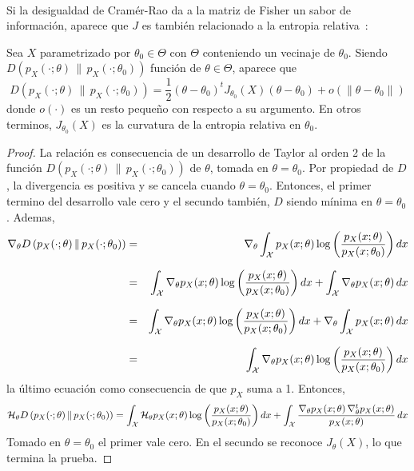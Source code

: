 \

Si  la  desigualdad de  Cram\'er-Rao  da  a la  matriz  de  Fisher  un sabor  de
informaci\'on,  aparece   que  $J$  es  tambi\'en  relacionado   a  la  entropia
relativa~\cite{CovTho06, Fri04}:
%
\begin{teorema}
  Sea $X$  parametrizado por $\theta_0  \in \Theta$ con $\Theta$  conteniendo un
  vecinaje  de   $\theta_0$.   Siendo   $D\left(  p_X(\cdot;\theta)  \,   \|  \,
    p_X(\cdot;\theta_0)  \right)$  funci\'on  de  $\theta \in  \Theta$,  aparece
  que
  \[
  D  \left( p_X(\cdot;\theta)  \, \|  \, p_X(\cdot;\theta_0)  \right)  = \frac12
  \left( \theta  - \theta_0 \right)^t  J_{\theta_0}(X) \left( \theta  - \theta_0
  \right) + o\left( \| \theta - \theta_0 \|\right)
  \]
  donde $o(\cdot)$ es un resto peque\~no  con respecto a su argumento.  En otros
  terminos,  $J_{\theta_0}(X)$  es  la  curvatura  de la  entropia  relativa  en
  $\theta_0$.
\end{teorema}
%
\begin{proof}
  La relaci\'on  es consecuencia  de un desarrollo  de Taylor  al orden 2  de la
  funci\'on $D\left( p_X(\cdot;\theta) \,  \| \, p_X(\cdot;\theta_0) \right)$ de
  $\theta$, tomada en $\theta =  \theta_0$. Por propiedad de $D$, la divergencia
  es  positiva y  se cancela  cuando $\theta  = \theta_0$.  Entonces,  el primer
  termino del desarrollo  vale cero y el secundo  tambi\'en, $D$ siendo m\'inima
  en $\theta = \theta_0$. Ademas,
  \begin{eqnarray*}
  \nabla_\theta D\left( p_X(\cdot;\theta) \, \| \, p_X(\cdot;\theta_0) \right) & =
  & \nabla_\theta \int_{\mathcal{X}} p_X(x;\theta) \log \left(
  \frac{p_X(x;\theta)}{p_X(x;\theta_0)} \right) dx\\[2.5mm]
  & = & \int_{\mathcal{X}} \nabla_\theta p_X(x;\theta) \log \left(
  \frac{p_X(x;\theta)}{p_X(x;\theta_0)} \right) dx + \int_{\mathcal{X}} \nabla_\theta
  p_X(x;\theta) \, dx\\[2.5mm]
  & = & \int_{\mathcal{X}} \nabla_\theta p_X(x;\theta) \log \left(
  \frac{p_X(x;\theta)}{p_X(x;\theta_0)} \right) dx + \nabla_\theta \int_{\mathcal{X}}
  p_X(x;\theta) \, dx\\[2.5mm]
  & = & \int_{\mathcal{X}} \nabla_\theta p_X(x;\theta) \log \left(
  \frac{p_X(x;\theta)}{p_X(x;\theta_0)} \right) dx
  \end{eqnarray*}
  la \'ultimo ecuaci\'on como consecuencia de que $p_X$ suma a 1.  Entonces,
  \[
  \mathcal{H}_\theta D\left( p_X(\cdot;\theta) \,  \| \, p_X(\cdot;\theta_0) \right) =
  \int_{\mathcal{X}}         \mathcal{H}_\theta         p_X(x;\theta)         \log         \left(
    \frac{p_X(x;\theta)}{p_X(x;\theta_0)}      \right)     dx      +     \int_{\mathcal{X}}
  \frac{\nabla_\theta          p_X(x;\theta)          \,         \nabla^t_\theta
    p_X(x;\theta)}{p_X(x;\theta)} \, dx
  \]
  Tomado en $\theta = \theta_0$ el  primer vale cero.  En el secundo se reconoce
  $J_\theta(X)$, lo que termina la prueba.
\end{proof}
